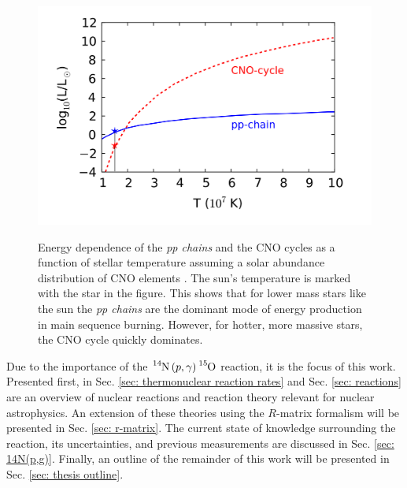 \begin{figure}
\includegraphics[width=\linewidth]{figures/energyProduction.png}
\label{fig: CNO-energy}
\caption{Energy dependence of the \textit{pp chains} and the CNO cycles as a function of stellar temperature assuming a solar abundance distribution of CNO elements \cite{Bertulani2016}. The sun's temperature is marked with the star in the figure. This shows that for lower mass stars like the sun the \textit{pp chains} are the dominant mode of energy production in main sequence burning. However, for hotter, more massive stars, the CNO cycle quickly dominates. }
\end{figure}



Due to the importance of the $\ce{^{14}N} \left( p, \gamma \right) \ce{^{15}O}$ reaction, it is the focus of this work. Presented first, in Sec. \ref{sec: thermonuclear reaction rates} and Sec. \ref{sec: reactions} are an overview of nuclear reactions and reaction theory relevant for nuclear astrophysics. An extension of these theories using the $R$-matrix formalism will be presented in Sec. \ref{sec: r-matrix}. The current state of knowledge surrounding the reaction, its uncertainties, and previous measurements are discussed in Sec. \ref{sec: 14N(p,g)}. Finally, an outline of the remainder of this work will be presented in Sec. \ref{sec: thesis outline}.


